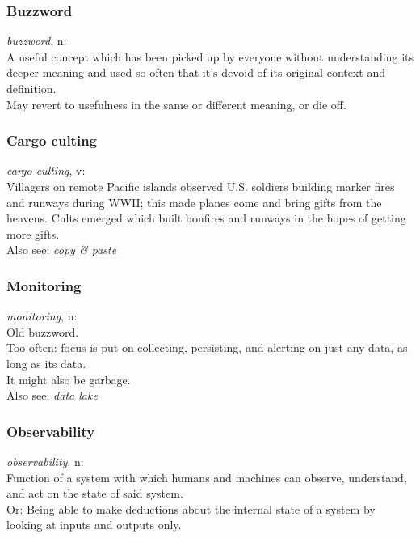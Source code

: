 \documentclass[aspectratio=169]{beamer}
\begin{document}
\begin{frame}
	\frametitle{Buzzword}
	\begin{center}
		\vfill
		\textit{buzzword}, n:\\
		A useful concept which has been picked up by everyone without understanding its deeper meaning and used so often that it's devoid of its original context and definition.\\
		May revert to usefulness in the same or different meaning, or die off.
		\vfill
	\end{center}
\end{frame}

\begin{frame}
	\frametitle{Cargo culting}
	\begin{center}
		\vfill
		\textit{cargo culting}, v:\\
		Villagers on remote Pacific islands observed U.S. soldiers building marker fires and runways during WWII; this made planes come and bring gifts from the heavens.
		Cults emerged which built bonfires and runways in the hopes of getting more gifts.\\
		Also see: \textit{copy \& paste}
		\vfill
	\end{center}
\end{frame}

\begin{frame}
	\frametitle{Monitoring}
	\begin{center}
		\vfill
		\textit{monitoring}, n:\\
		Old buzzword.\\
		Too often: focus is put on collecting, persisting, and alerting on just any data, as long as its data.\\
		It might also be garbage.\\
		Also see: \textit{data lake}
		\vfill
	\end{center}
\end{frame}

\begin{frame}
	\frametitle{Observability}
	\begin{center}
		\vfill
		\textit{observability}, n:\\
		Function of a system with which humans and machines can observe, understand, and act on the state of said system.\\
		Or: Being able to make deductions about the internal state of a system by looking at inputs and outputs only.
		\vfill
	\end{center}
\end{frame}
\end{document}
